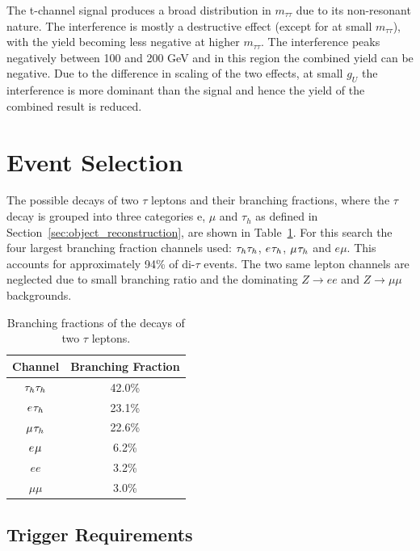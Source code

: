 The t-channel signal produces a broad distribution in $m_{\tau\tau}$ due to its non-resonant nature.
The interference is mostly a destructive effect (except for at small $m_{\tau\tau}$), with the yield becoming less negative at higher $m_{\tau\tau}$.
The interference peaks negatively between 100 and 200 GeV and in this region the combined yield can be negative.
Due to the difference in scaling of the two effects, at small $g_{U}$ the interference is more dominant than the signal and hence the yield of the combined result is reduced.

\section{Event Selection}

The possible decays of two $\tau$ leptons and their branching fractions, where the $\tau$ decay is grouped into three categories e, $\mu$ and $\tau_h$ as defined in Section~\ref{sec:object_reconstruction}, are shown in Table~\ref{tab:ditau_br}. 
For this search the four largest branching fraction channels used: $\tau_{h}\tau_{h}$, $e_{}\tau_{h}$, $\mu_{}\tau_{h}$ and $e\mu$.
This accounts for approximately 94\% of di-$\tau$ events.
The two same lepton channels are neglected due to small branching ratio and the dominating $Z\rightarrow ee$ and $Z\rightarrow \mu\mu$ backgrounds. \\

\begin{table}[!hbtp]
    \centering
    \begin{tabular}{|c|c|}
         \hline
         Channel & Branching Fraction  \\
         \hline
         \hline
         $\tau_{h}\tau_{h}$ & 42.0\% \\
         $e_{}\tau_{h}$ & 23.1\% \\
         $\mu_{}\tau_{h}$ & 22.6\% \\
         $e_{}\mu_{}$ & 6.2\% \\
         $e e$ & 3.2\% \\
         $\mu \mu$ & 3.0\% \\
         \hline
    \end{tabular}
    \caption{Branching fractions of the decays of two $\tau$ leptons.}
    \label{tab:ditau_br}
\end{table}

\subsection{Trigger Requirements}

